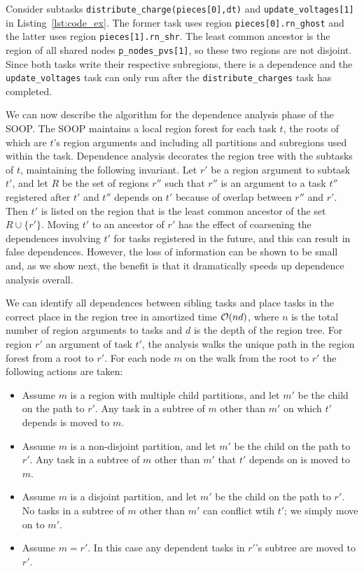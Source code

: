 Consider subtasks {\tt distribute\_charge(pieces[0],dt)} and
{\tt update\_voltages[1]} in Listing~\ref{lst:code_ex}.  The former task
uses region {\tt pieces[0].rn\_ghost} and the latter uses region {\tt pieces[1].rn\_shr}.
The least common ancestor is the region of all shared nodes {\tt p\_nodes\_pvs[1]},
so these two regions are not disjoint.  Since both tasks write their respective subregions,
there is a dependence and the {\tt update\_voltages} task can only run after the
{\tt distribute\_charges} task has completed.  

We can now describe the algorithm for the dependence analysis phase of
the SOOP.  The SOOP maintains a local region forest for each task $t$,
the roots of which are $t$'s region arguments and including all
partitions and subregions used within the task.  Dependence analysis
decorates the region tree with the subtasks of $t$, maintaining the
following invariant. Let $r'$ be a region argument to subtask $t'$,
and let $R$ be the set of regions $r''$ such that $r''$ is an argument
to a task $t''$ registered after $t'$ and $t''$ depends on $t'$ because
of overlap between $r''$ and $r'$.  Then $t'$ is listed on the region that
is the least common ancestor of the set $R \cup \{r'\}$.  Moving $t'$ to an
ancestor of $r'$ has the effect of coarsening the dependences involving $t'$
for tasks registered in the future, and this can result in false dependences.
However, the loss of information can be shown to be small and, as we show next, the
benefit is that it dramatically speeds up dependence analysis overall.

We can identify all dependences between sibling tasks and place tasks
in the correct place in the region tree in amortized time ${\cal O}(nd)$,
where $n$ is the total number of region arguments to tasks and $d$ is the depth
of the region tree.  For region $r'$ an argument of task $t'$, the analysis
walks the unique path in the region forest from a root to $r'$.  For each node $m$
on the walk from the root to $r'$ the following actions are taken:
\begin{itemize}
\item Assume $m$ is a region with multiple child partitions, and let $m'$ be the child on the
path to $r'$.  Any task in a subtree of $m$ other than $m'$ on which $t'$ depends 
is moved to $m$.

\item Assume $m$ is a non-disjoint partition, and let $m'$ be the child on the
path to $r'$.  Any task in a subtree of $m$ other than $m'$ that $t'$ depends on is
moved to $m$.

\item Assume $m$ is a disjoint partition, and let $m'$ be the child on the
path to $r'$.  No tasks in a subtree of $m$ other than $m'$ can conflict wtih $t'$; we simply move
on to $m'$.

\item Assume $m = r'$.  In this case any dependent tasks in $r'$'s subtree are moved to $r'$.
\end{itemize}

